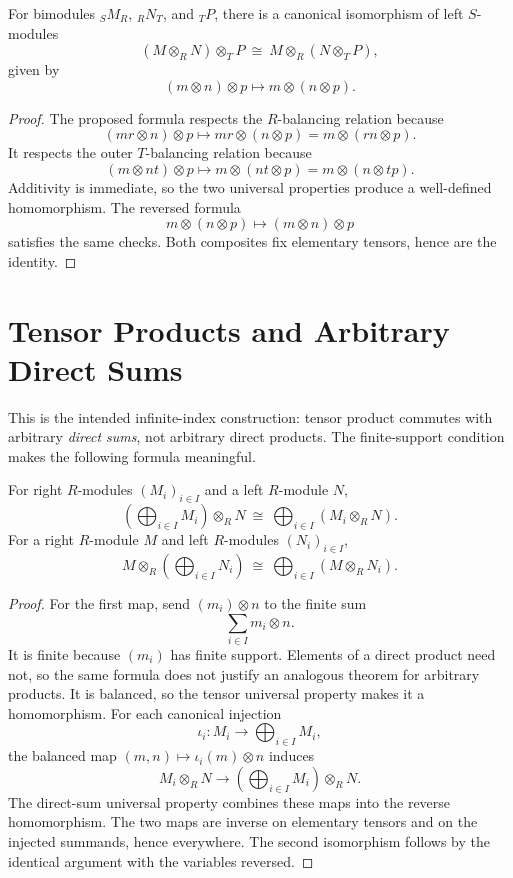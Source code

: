 \begin{theorem}[Associativity]\label{thm:tensor-associativity}
For bimodules \({}_SM_R\), \({}_RN_T\), and \({}_TP\), there is a canonical
isomorphism of left \(S\)-modules
\[
(M\otimes_RN)\otimes_TP
\ \cong\
M\otimes_R(N\otimes_TP),
\]
given by
\[
(m\otimes n)\otimes p\longmapsto m\otimes(n\otimes p).
\]
\end{theorem}
\begin{proof}
The proposed formula respects the \(R\)-balancing relation because
\[
(mr\otimes n)\otimes p
\longmapsto mr\otimes(n\otimes p)
=m\otimes(rn\otimes p).
\]
It respects the outer \(T\)-balancing relation because
\[
(m\otimes nt)\otimes p
\longmapsto m\otimes(nt\otimes p)
=m\otimes(n\otimes tp).
\]
Additivity is immediate, so the two universal properties produce a
well-defined homomorphism. The reversed formula
\[
m\otimes(n\otimes p)\longmapsto(m\otimes n)\otimes p
\]
satisfies the same checks. Both composites fix elementary tensors, hence are
the identity.
\end{proof}

\section{Tensor Products and Arbitrary Direct Sums}\label{sec:tensor-direct-sums}
This is the intended infinite-index construction: tensor product commutes
with arbitrary \emph{direct sums}, not arbitrary direct products. The
finite-support condition makes the following formula meaningful.

\begin{theorem}\label{thm:tensor-direct-sums}
For right \(R\)-modules \((M_i)_{i\in I}\) and a left \(R\)-module \(N\),
\[
\left(\bigoplus_{i\in I}M_i\right)\otimes_RN
\ \cong\
\bigoplus_{i\in I}(M_i\otimes_RN).
\]
For a right \(R\)-module \(M\) and left \(R\)-modules \((N_i)_{i\in I}\),
\[
M\otimes_R\left(\bigoplus_{i\in I}N_i\right)
\ \cong\
\bigoplus_{i\in I}(M\otimes_RN_i).
\]
\end{theorem}
\begin{proof}
For the first map, send \((m_i)\otimes n\) to the finite sum
\[
\sum_{i\in I}m_i\otimes n.
\]
It is finite because \((m_i)\) has finite support. Elements of a direct
product need not, so the same formula does not justify an analogous theorem
for arbitrary products.
It is balanced, so the tensor universal property makes it a homomorphism.
For each canonical injection
\[
\iota_i:M_i\longrightarrow\bigoplus_{i\in I}M_i,
\]
the balanced map \((m,n)\mapsto\iota_i(m)\otimes n\) induces
\[
M_i\otimes_RN\longrightarrow
\left(\bigoplus_{i\in I}M_i\right)\otimes_RN.
\]
The direct-sum universal property combines these maps into the reverse
homomorphism. The two maps are inverse on elementary tensors and on the injected
summands, hence everywhere. The second isomorphism follows by the identical
argument with the variables reversed.
\end{proof}

